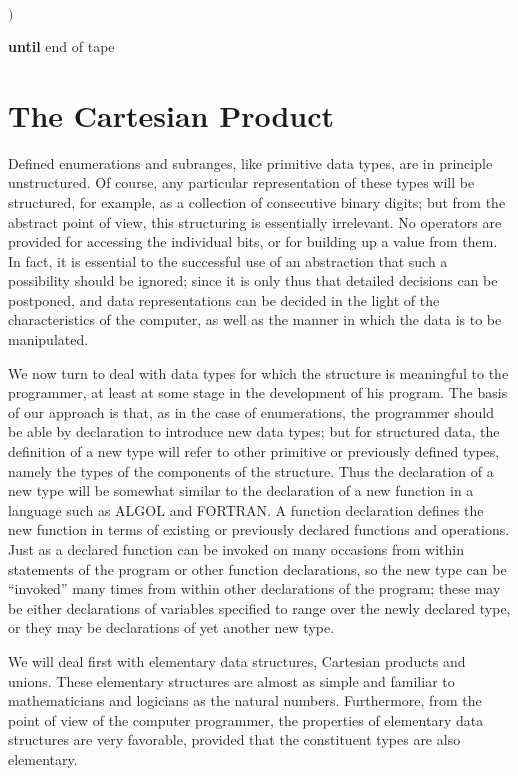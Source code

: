 \quad $)$

\textbf{until} end of tape

\section[The Cartesian product]{The Cartesian Product}

Defined enumerations and subranges, like primitive data types, are in principle unstructured. Of course, any particular representation of these types will be structured, for example, as a collection of consecutive binary digits; but from the abstract point of view, this structuring is essentially irrelevant. No operators are provided for accessing the individual bits, or for building up a value from them. In fact, it is essential to the successful use of an abstraction that such a possibility should be ignored; since it is only thus that detailed decisions can be postponed, and data representations can be decided in the light of the characteristics of the computer, as well as the manner in which the data is to be manipulated.

We now turn to deal with data types for which the structure is meaningful to the programmer, at least at some stage in the development of his program. The basis of our approach is that, as in the case of enumerations, the programmer should be able by declaration to introduce new data types; but for structured data, the definition of a new type will refer to other primitive or previously defined types, namely the types of the components of the structure. Thus the declaration of a new type will be somewhat similar to the declaration of a new function in a language such as ALGOL and FORTRAN. A function declaration defines the new function in terms of existing or previously declared functions and operations. Just as a declared function can be invoked on many occasions from within statements of the program or other function declarations, so the new type can be ``invoked'' many times from within other declarations of the program; these may be either declarations of variables specified to range over the newly declared type, or they may be declarations of yet another new type.

We will deal first with elementary data structures, Cartesian products and unions. These elementary structures are almost as simple and familiar to mathematicians and logicians as the natural numbers. Furthermore, from the point of view of the computer programmer, the properties of elementary data structures are very favorable, provided that the constituent types are also elementary.

